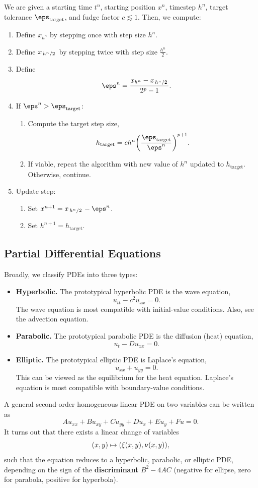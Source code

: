\documentclass[12pt,letterpaper]{article}
\begin{document}
\begin{algorithm}
    We are given a starting time $t^n$, starting position $x^n$, timestep $h^n$, target tolerance $\eps_{\text{target}}$, and fudge factor $c\lesssim1$. Then, we compute:
    \begin{enumerate}
        \item Define $x_{h^n}$ by stepping once with step size $h^n$.
        \item Define $x_{\flatfrac{h^n}2}$ by stepping twice with step size $\frac{h^n}2$.
        \item Define
        \[\eps^n=\frac{x_{h^n}-x_{\flatfrac{h^n}2}}{2^p-1}.\]
        \item If $\eps^n>\eps_{\text{target}}$:
        \begin{enumerate}
            \item Compute the target step size,
            \[h_{\text{target}}=ch^n\qty(\frac{\eps_{\text{target}}}{\eps^n})^{p+1}.\]
            \item If viable, repeat the algorithm with new value of $h^n$ updated to $h_{\text{target}}$. Otherwise, continue.
        \end{enumerate}
        \item Update step:
        \begin{enumerate}
            \item Set $x^{n+1}=x_{\flatfrac{h^n}2}-\eps^n$.
            \item Set $h^{n+1}=h_{\text{target}}$.
        \end{enumerate}
    \end{enumerate}
\end{algorithm}
\subsection{Partial Differential Equations}
Broadly, we classify PDEs into three types:
\begin{itemize}
    \item \textbf{Hyperbolic.} The prototypical hyperbolic PDE is the wave equation,
    \[u_{tt}-c^2u_{xx}=0.\]
    The wave equation is most compatible with initial-value conditions. Also, see the advection equation.
    \item \textbf{Parabolic.} The prototypical parabolic PDE is the diffusion (heat) equation,
    \[u_t-Du_{xx}=0.\]
    \item \textbf{Elliptic.} The prototypical elliptic PDE is Laplace's equation,
    \[u_{xx}+u_{yy}=0.\]
    This can be viewed as the equilibrium for the heat equation. Laplace's equation is most compatible with boundary-value conditions.
\end{itemize}
A general second-order homogeneous linear PDE on two variables can be written as
\[Au_{xx}+Bu_{xy}+Cu_{yy}+Du_x+Eu_y+Fu=0.\]
It turns out that there exists a linear change of variables
\[(x,y)\mapsto\qty(\xi(x,y),\nu(x,y)),\]
such that the equation reduces to a hyperbolic, parabolic, or elliptic PDE, depending on the sign of the \textbf{discriminant} $B^2-4AC$ (negative for ellipse, zero for parabola, positive for hyperbola).
\end{document}
